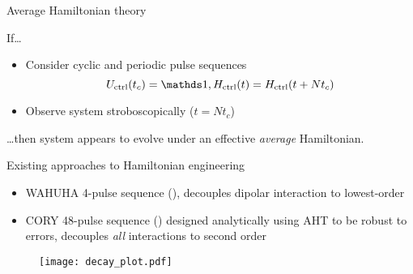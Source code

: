 \documentclass{beamer}
\begin{document}
\begin{frame}{Average Hamiltonian theory}

If\dots
\begin{itemize}
    \item Consider cyclic and periodic pulse sequences
    \[
    U_{\text{ctrl}}(t_c) = \identity, H_{\text{ctrl}}(t) = H_{\text{ctrl}}(t + Nt_c)
    \]
    \item Observe system stroboscopically ($t = Nt_c$)
\end{itemize}
\dots then system appears to evolve under an effective \emph{average} Hamiltonian.

\begin{figure}
\centering
\scalebox{.7}{

}
\end{figure}


\end{frame}

\begin{frame}{Existing approaches to Hamiltonian engineering}

\begin{itemize}
    \item WAHUHA 4-pulse sequence (\cite{PhysRevLett.20.180}), decouples dipolar interaction to lowest-order

    \item CORY 48-pulse sequence (\cite{CORY1990205}) designed analytically using AHT to be robust to errors, decouples \emph{all} interactions to second order
\end{itemize}

\begin{figure}
\centering
\texttt{[image: decay\_plot.pdf]}
\end{figure}


\end{frame}
\end{document}
